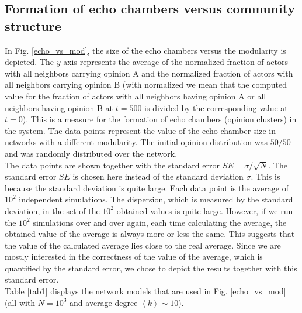 \documentclass[11 pt , letterpaper , twoside , openright]{book}
\begin{document}

\subsection{Formation of echo chambers versus community structure}\label{echoVSmod}

In Fig. \ref{echo_vs_mod}, the size of the echo chambers versus the modularity is depicted. The $y$-axis represents the average of the normalized fraction of actors with all neighbors carrying opinion A and the normalized fraction of actors with all neighbors carrying opinion B (with normalized we mean that the computed value for the fraction of actors with all neighbors having opinion A or all neighbors having opinion B at $t=500$ is divided by the corresponding value at $t=0$). This is a measure for the formation of echo chambers (opinion clusters) in the system. The data points represent the value of the echo chamber size in networks with a different modularity. The initial opinion distribution was $50/50$ and was randomly distributed over the network. \\
\newline
The data points are shown together with the standard error $SE = \sigma /\sqrt{N}$. The standard error $SE$ is chosen here instead of the standard deviation $\sigma$. This is because the standard deviation is quite large. Each data point is the average of $10^2$ independent simulations. The dispersion, which is measured by the standard deviation, in the set of the $10^2$ obtained values is quite large. However, if we run the $10^2$ simulations over and over again, each time calculating the average, the obtained value of the average is always more or less the same. This suggests that the value of the calculated average lies close to the real average. Since we are mostly interested in the correctness of the value of the average, which is quantified by the standard error, we chose to depict the results together with this standard error.\\
\newline
Table \ref{tab1} displays the network models that are used in Fig. \ref{echo_vs_mod} (all with $N = 10^3$ and average degree $\left<k\right> \sim 10$).
\end{document}
